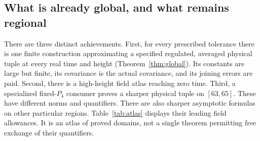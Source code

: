 \subsection{What is already global, and what remains regional}
There are three distinct achievements. First, for every prescribed
tolerance there is one finite construction approximating a specified
regulated, averaged physical tuple at every real time and height
(Theorem~\ref{thm:global}). Its constants are large but finite, its
covariance is the actual covariance, and its joining errors are paid.
Second, there is a high-height field atlas reaching zero time. Third, a specialized fixed-$P_4$ consumer proves a sharper physical tuple on $[63,65]$. These have different norms and quantifiers. There are also sharper asymptotic formulas on other particular regions.
Table~\ref{tab:atlas} displays their leading field allowances. It is an
atlas of proved domains, not a single theorem permitting free exchange
of their quantifiers.

